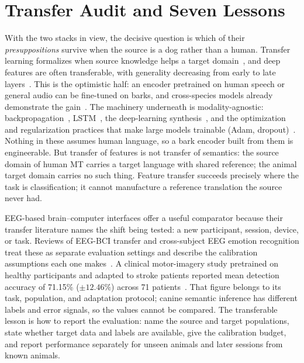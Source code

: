 \section{Transfer Audit and Seven Lessons}
\label{sec:transfer}
\label{sec:lessons}

With the two stacks in view, the decisive question is which of their
\emph{presuppositions} survive when the source is a dog rather than a human.
Transfer learning formalizes when source knowledge helps a target
domain~\cite{pan2010transfer,zhuang2021transfer}, and deep features are
often transferable, with generality decreasing from early to late
layers~\cite{yosinski2014transferable}. This is the optimistic half: an
encoder pretrained on human speech or general audio can be fine-tuned on
barks, and cross-species models already demonstrate the
gain~\cite{hagiwara2023aves,ghani2023perch}. The machinery underneath is
modality-agnostic: backpropagation~\cite{rumelhart1986backprop},
LSTM~\cite{hochreiter1997lstm}, the deep-learning
synthesis~\cite{lecun2015deep,bengio2013representation,goodfellow2016deep},
and the optimization and regularization practices that make large models
trainable (Adam, dropout)~\cite{kingma2015adam,srivastava2014dropout}.
Nothing in these assumes human language, so a bark encoder built from them
is engineerable. But transfer of features is not transfer of semantics: the
source domain of human MT carries a target language with shared reference;
the animal target domain carries no such thing. Feature transfer succeeds
precisely where the task is classification; it cannot manufacture a
reference translation the source never had.

EEG-based brain--computer interfaces offer a useful comparator because their
transfer literature names the shift being tested: a new participant, session,
device, or task. Reviews of EEG-BCI transfer and cross-subject EEG emotion
recognition treat these as separate evaluation settings and describe the
calibration assumptions each one makes~\cite{wu2022bci,apicella2024eegemotion}.
A clinical motor-imagery study pretrained on healthy participants and adapted
to stroke patients reported mean detection accuracy of 71.15\% ($\pm12.46\%$)
across
71 patients~\cite{nagarajan2024stroke}. That figure belongs to its task,
population, and adaptation protocol; canine semantic inference has different
labels and error signals, so the values cannot be compared. The transferable
lesson is how to report the evaluation: name the source and target populations,
state whether target data and labels are available, give the calibration
budget, and report performance separately for unseen animals and later
sessions from known animals.

